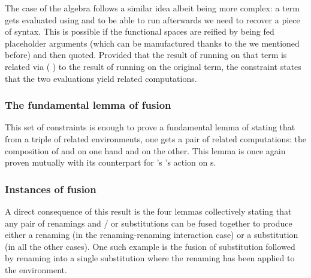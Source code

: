 \begin{agdasnippet}
\addtolength{\leftskip}{\parindent}
\end{agdasnippet}
The case of the algebra follows a similar idea albeit being more complex:
a term gets evaluated using  and to be able to run 
afterwards we need to recover a piece of syntax. This is possible if the
 functional spaces are reified by being fed placeholder  arguments
(which can be manufactured thanks to the  we mentioned before) and
then quoted. Provided that the result of running  on that term is
related via    (  ) to the result
of running  on the original term, the  constraint states
that the two evaluations yield related computations.

\begin{agdasnippet}
\addtolength{\leftskip}{\parindent}
\end{agdasnippet}

\subsubsection{The fundamental lemma of fusion}

This set of constraints is enough to prove a fundamental lemma of 
stating that from a triple of related environments, one gets a pair of related
computations: the composition of  and  on one hand and
 on the other. This lemma is once again proven mutually with its
counterpart for \semrec{}'s 's action on s.

\begin{agdasnippet}
\end{agdasnippet}

\subsubsection{Instances of fusion}

A direct consequence of this result is the four lemmas collectively stating
that any pair of renamings and / or substitutions can be fused together to
produce either a renaming (in the renaming-renaming interaction case) or a
substitution (in all the other cases). One such example is the fusion of
substitution followed by renaming into a single substitution where the
renaming has been applied to the environment.


